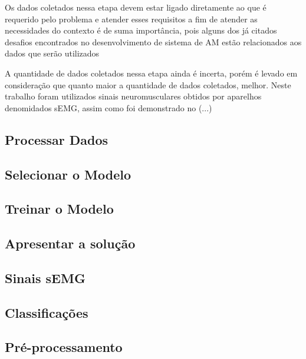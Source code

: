 Os dados coletados nessa etapa devem estar ligado diretamente ao que é requerido pelo problema e atender esses requisitos a fim de atender as necessidades do contexto é de suma importância, pois alguns dos já citados desafios encontrados no desenvolvimento de sistema de AM estão relacionados aos dados que serão utilizados \cite{Aurélien}

A quantidade de dados coletados nessa etapa ainda é incerta, porém é levado em consideração que quanto maior a quantidade de dados coletados, melhor. Neste trabalho foram utilizados sinais neuromusculares obtidos por aparelhos denomidados sEMG, assim como foi demonstrado no (...)

\subsection{Processar Dados}

\subsection{Selecionar o Modelo}

\subsection{Treinar o Modelo}

\subsection{Apresentar a solução}

\subsection{Sinais sEMG}
\subsection{Classificações}
\subsection{Pré-processamento}
